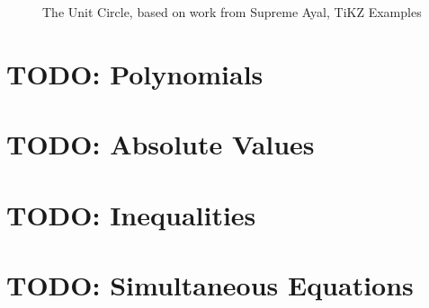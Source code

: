\begin{figure}[!hbt]
\caption{The Unit Circle, based on work from Supreme Ayal, TiKZ Examples
\cite{HTrCS}}
\end{figure}
\newpage

\newpage
\section{TODO: Polynomials}
\label{sec:Polynomials}
\lipsum[1]
\newpage
\section{TODO: Absolute Values}
\label{sec:AbsoluteValues}
\lipsum[1]
\newpage
\section{TODO: Inequalities}
\label{sec:Inequalities}
\lipsum[1]
\newpage
\section{TODO: Simultaneous Equations}
\label{sec:SimultaneousEquations}
\lipsum[1]
\newpage
